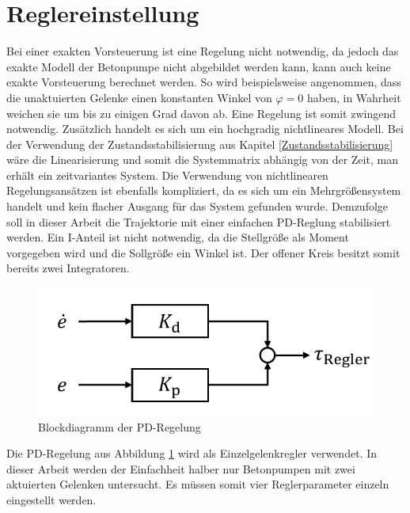 \section{Reglereinstellung}
Bei einer exakten Vorsteuerung ist eine Regelung nicht notwendig, da jedoch das exakte Modell der Betonpumpe nicht abgebildet werden kann, kann auch keine exakte Vorsteuerung berechnet werden. So wird beispielsweise angenommen, dass die unaktuierten Gelenke einen konstanten Winkel von $\varphi = 0$ haben, in Wahrheit weichen sie um bis zu einigen Grad davon ab. Eine Regelung ist somit zwingend notwendig. \newline
Zusätzlich handelt es sich um ein hochgradig nichtlineares Modell. Bei der Verwendung der Zustandsstabilisierung aus Kapitel \ref{Zustandsstabilisierung} wäre die Linearisierung und somit die Systemmatrix abhängig von der Zeit, man erhält ein zeitvariantes System. Die Verwendung von nichtlinearen Regelungsansätzen ist ebenfalls kompliziert, da es sich um ein Mehrgrößensystem handelt und kein flacher Ausgang für das System gefunden wurde.\newline
Demzufolge soll in dieser Arbeit die Trajektorie mit einer einfachen PD-Reglung stabilisiert werden. Ein I-Anteil ist nicht notwendig, da die Stellgröße als Moment vorgegeben wird und die Sollgröße ein Winkel ist. Der offener Kreis besitzt somit bereits zwei Integratoren.\newline
	\begin{figure}[h!]
		\centering
		\includegraphics[scale=0.7]{Bilder/PD_Regler.pdf}
		\caption{Blockdiagramm der PD-Regelung}
		\label{fig:Blockdiagramm_PD_Regelung}
	\end{figure}\newline
Die PD-Regelung aus Abbildung \ref{fig:Blockdiagramm_PD_Regelung} wird als Einzelgelenkregler verwendet. In dieser Arbeit werden der Einfachheit halber nur Betonpumpen mit zwei aktuierten Gelenken untersucht. Es müssen somit vier Reglerparameter einzeln eingestellt werden.\newline
